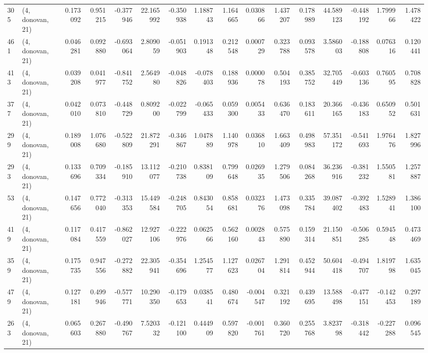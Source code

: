 \begin{tabular}{llrrrrrrrrrrrrrr}
305 &  (4, donovan, 21) &   0.173092 &  0.951215 & -0.377946 &    22.165992 &  -0.350938 &   1.188743 &   1.164665 &  0.030866 &  1.437207 &  0.178989 &   44.589123 & -0.448192 &  1.799966 &  1.478422 \\
461 &  (4, donovan, 21) &   0.046281 &  0.092880 & -0.693064 &     2.809059 &  -0.051903 &   0.191348 &   0.212548 &  0.000729 &  0.323788 &  0.093578 &    3.586003 & -0.188808 &  0.076316 &  0.120441 \\
413 &  (4, donovan, 21) &   0.039208 &  0.041977 & -0.841752 &     2.564980 &  -0.048826 &  -0.078403 &   0.188936 &  0.000078 &  0.504193 &  0.385752 &   32.705449 & -0.603136 &  0.760595 &  0.708828 \\
377 &  (4, donovan, 21) &   0.042010 &  0.073810 & -0.448729 &     0.809200 &  -0.022799 &  -0.065433 &   0.059300 &  0.005433 &  0.636470 &  0.183611 &   20.366165 & -0.436183 &  0.650952 &  0.501631 \\
299 &  (4, donovan, 21) &   0.189008 &  1.076680 & -0.522809 &    21.872291 &  -0.346867 &   1.047889 &   1.140978 &  0.036810 &  1.663409 &  0.498983 &   57.351172 & -0.541693 &  1.976476 &  1.827996 \\
293 &  (4, donovan, 21) &   0.133696 &  0.709334 & -0.185910 &    13.112077 &  -0.210738 &   0.838109 &   0.799648 &  0.026935 &  1.279506 &  0.084268 &   36.236916 & -0.381232 &  1.550581 &  1.257887 \\
53  &  (4, donovan, 21) &   0.147656 &  0.772040 & -0.313353 &    15.449584 &  -0.248705 &   0.843054 &   0.858681 &  0.032376 &  1.473098 &  0.335784 &   39.087402 & -0.392483 &  1.528941 &  1.386100 \\
419 &  (4, donovan, 21) &   0.117084 &  0.417559 & -0.862027 &    12.927106 &  -0.222976 &   0.062566 &   0.562160 &  0.002843 &  0.575890 &  0.159314 &   21.150851 & -0.506285 &  0.594548 &  0.473469 \\
359 &  (4, donovan, 21) &   0.175735 &  0.947556 & -0.272882 &    22.305941 &  -0.354696 &   1.254577 &   1.127623 &  0.026704 &  1.291814 &  0.452944 &   50.604418 & -0.494707 &  1.819798 &  1.635045 \\
479 &  (4, donovan, 21) &   0.127181 &  0.499946 & -0.577771 &    10.290350 &  -0.179653 &   0.038541 &   0.480674 & -0.004547 &  0.321192 &  0.439695 &   13.588498 & -0.477151 & -0.142453 &  0.297189 \\
263 &  (4, donovan, 21) &   0.065603 &  0.267880 & -0.490767 &     7.520332 &  -0.121100 &   0.444909 &   0.597820 & -0.001761 &  0.360720 &  0.255768 &    3.823798 & -0.318442 & -0.227288 &  0.096545 \\

\end{tabular}
